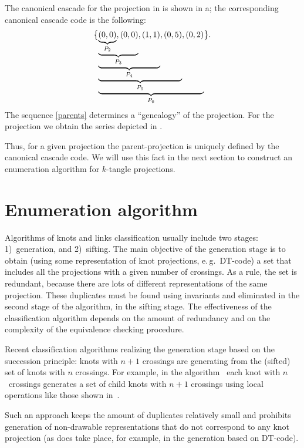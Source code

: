 \documentclass[12pt]{article}
\begin{document}
The canonical cascade for the projection in  is shown in
a; the corresponding canonical cascade code is the following:
$$\let\ub=\underbrace
\bigl\{\ub{\ub{\ub{\ub{\ub{(0,0)}_{P_2},(0,0)}_{P_3},(1,1)}_{P_4},(0,5)}_{P_5},(0,2)}_{P_6}\bigr\}.
$$
The sequence \eqref{parents} determines a ``genealogy'' of the projection. For the projection
 we obtain the series depicted in .


\noindent Thus, for a given projection the parent-projection is uniquely defined by the canonical
cascade code. We will use this fact in the next section to construct an enumeration algorithm for
$k$-tangle projections.


\section{Enumeration algorithm}\label{alg}

Algorithms of knots and links classification usually include two stages: 1)~generation, and
2)~sifting. The main objective of the generation stage is to obtain (using some representation of
knot projections, e.\,g.~DT-code) a set that includes all the projections with a given number of
crossings. As a rule, the set is redundant, because there are lots of different representations
of the same projection. These duplicates must be found using invariants and eliminated in the
second stage of the algorithm, in the sifting stage. The effectiveness of the classification
algorithm depends on the amount of redundancy and on the complexity of the equivalence checking
procedure.

Recent classification algorithms \cite{Hoste2006,Rankin2002_1} realizing the generation stage
based on the succession principle: knots with $n{+}1$ crossings are generating from the (sifted)
set of knots with $n$ crossings. For example, in the
algorithm~\cite{Rankin2002_1,Rankin2002_2,Rankin2002_3} each knot with $n$~crossings generates a
set of child knots with $n{+}1$ crossings using local operations like those shown
in~.


Such an approach keeps the amount of duplicates relatively small and prohibits generation of
non-drawable representations that do not correspond to any knot projection (as does take place,
for example, in the generation based on DT-code).
\end{document}
